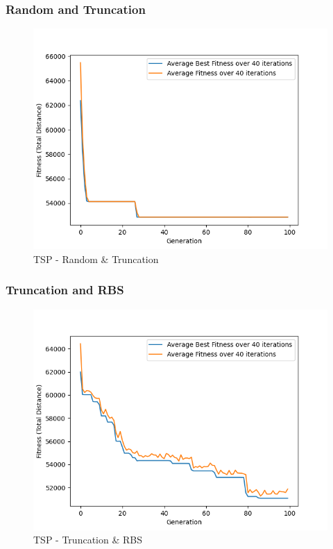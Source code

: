 \documentclass[11pt, letterpaper]{article}
\begin{document}
\subsubsection {Random and Truncation}
\begin{figure}[H]
    \centering
    \includegraphics[scale = 0.6]{images/tsp_rd_tr.png}
    \caption {TSP - Random \& Truncation}
    \label {fig:tpsRT}
\end{figure}
\subsubsection {Truncation and RBS}
\begin{figure}[H]
    \centering
    \includegraphics[scale = 0.6]{images/tsp_tr_rb.png}
    \caption {TSP - Truncation \& RBS}
    \label {fig:tpsTR}
\end{figure}
\end{document}
